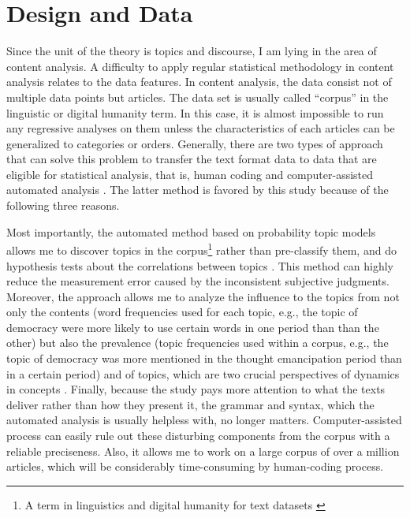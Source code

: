 \documentclass[abstracton,UTF8]{ctexart}
\begin{document}
\section{Design and Data}
Since the unit of the theory is topics and discourse, I am lying in the area of content analysis. A difficulty to apply regular statistical methodology in content analysis relates to the data features. In content analysis, the data consist not of multiple data points but articles. The data set is usually called ``corpus'' \citep{Jockers2013} in the linguistic or digital humanity term. In this case, it is almost impossible to run any regressive analyses on them unless the characteristics of each articles can be generalized to categories or orders. Generally, there are two types of approach that can solve this problem to transfer the text format data to data that are eligible for statistical analysis, that is, human coding and computer-assisted automated analysis \citep{Lucas2015,Blei2012,Roberts2014}. The latter method is favored by this study because of the following three reasons.

Most importantly, the automated method based on probability topic models allows me to discover topics in the corpus\footnote{A term in linguistics and digital humanity for text datasets \citep{Jockers2013}} rather than pre-classify them, and do hypothesis tests about the correlations between topics \citep{Roberts2013}. This method can highly reduce the measurement error caused by the inconsistent subjective judgments. Moreover, the approach allows me to analyze the influence to the topics from not only the contents (word frequencies used for each topic, e.g., the topic of democracy were more likely to use certain words in one period than than the other) but also the prevalence (topic frequencies used within a corpus, e.g., the topic of democracy was more mentioned in the thought emancipation period than in a certain period) and  of topics, which are two crucial perspectives of dynamics in concepts \citep{Lucas2015}.  Finally, because the study pays more attention to what the texts deliver rather than how they present it, the grammar and syntax, which the automated analysis is usually helpless with, no longer matters. Computer-assisted process can easily rule out these disturbing components from the corpus with a reliable preciseness. Also, it allows me to work on a large corpus of over a million articles, which will be considerably time-consuming by human-coding process.
\end{document}
